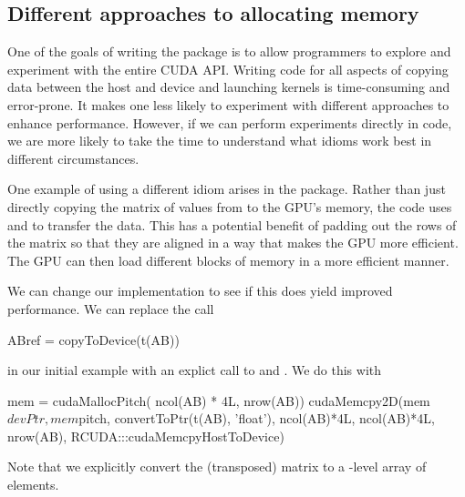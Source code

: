 \begin{comment}
Timings
See runDistTimes.R
For $224,970,001$ distances (14999^2),
R's \Rfunc{dist} takes 285.6 seconds (elapsed time).
On the Tesla K20, it takes 8.47 seconds.
This is is a speed-up factor of 33.7. And we see about 33 - 35 on different runs.
\end{comment}

\subsection{Different approaches to allocating memory} 
One of the goals of writing the  package
is to allow \R{} programmers to explore and experiment
with the entire CUDA API. 
Writing \C{} code for all aspects of copying data between
the host and device and launching kernels is time-consuming and error-prone.
It makes one less likely to experiment with different approaches to
enhance performance. However, if we can perform experiments directly
in  \R{} code, we are more likely to take the time to understand what
idioms work best in different circumstances.

One example of using a different idiom arises in the 
package. Rather than just directly copying the matrix of values from
\R{} to the GPU's memory, the \C{} code uses 
and  to transfer the data.  This has a potential
benefit of padding out the rows of the matrix so that they are aligned
in a way that makes the GPU more efficient. The GPU can then load
different blocks of memory in a more efficient manner.

We can change our implementation  to see if this does yield 
improved performance.
We can replace the call 
\begin{RCode}
ABref = copyToDevice(t(AB))
\end{RCode}
in our initial example with an explict
call to  and .
We do this with
\begin{RCode}
mem = cudaMallocPitch( ncol(AB) * 4L,  nrow(AB))
cudaMemcpy2D(mem$devPtr, mem$pitch, 
             convertToPtr(t(AB), 'float'), 
             ncol(AB)*4L, ncol(AB)*4L, nrow(AB),
             RCUDA:::cudaMemcpyHostToDevice)
\end{RCode}
Note that we explicitly convert the (transposed)
matrix to a \C-level array of  elements.



